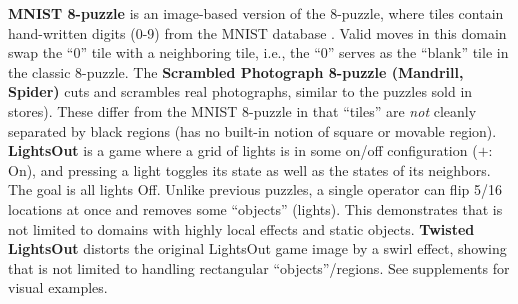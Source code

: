 \textbf{MNIST 8-puzzle}
is an image-based version of the 8-puzzle, where tiles contain hand-written digits (0-9) from the  MNIST database \cite{lecun1998gradient}.
Valid moves in this domain swap the ``0'' tile  with a neighboring tile, i.e., the ``0'' serves as the ``blank'' tile in the classic 8-puzzle. 
The \textbf{Scrambled Photograph 8-puzzle (Mandrill, Spider)} cuts and scrambles real photographs, similar to the puzzles sold in stores).
These differ from the MNIST 8-puzzle in that ``tiles'' are \textit{not} cleanly separated by black regions
(\latentplanner has no built-in notion of square or movable region).
\textbf{LightsOut} is
a game where a grid of lights is in some on/off configuration ($+$: On),
and pressing a light toggles its state as well as the states of its neighbors.
The goal is all lights Off.
Unlike previous puzzles, a single operator can flip 5/16 locations at once and
removes some ``objects'' (lights).
This demonstrates that \latentplanner is not limited to domains with highly local effects and static objects.
\textbf{Twisted LightsOut} distorts the original LightsOut game image by a swirl effect,
showing that \latentplanner is not limited to handling rectangular ``objects''/regions.
See supplements for visual examples.

